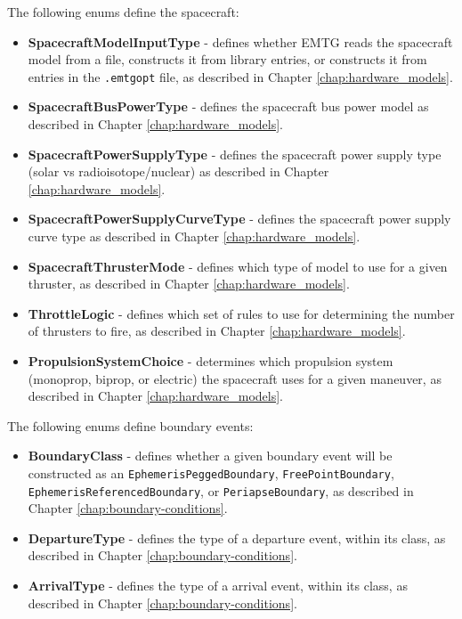 The following enums define the spacecraft:
\begin{itemize}
	\item \textbf{SpacecraftModelInputType} - defines whether EMTG reads the spacecraft model from a file, constructs it from library entries, or constructs it from entries in the \texttt{.emtgopt} file, as described in Chapter \ref{chap:hardware_models}.
	\item \textbf{SpacecraftBusPowerType} - defines the spacecraft bus power model as described in Chapter \ref{chap:hardware_models}.
	\item \textbf{SpacecraftPowerSupplyType} - defines the spacecraft power supply type (solar vs radioisotope/nuclear) as described in Chapter \ref{chap:hardware_models}.
	\item \textbf{SpacecraftPowerSupplyCurveType} - defines the spacecraft power supply curve type as described in Chapter \ref{chap:hardware_models}.
	\item \textbf{SpacecraftThrusterMode} - defines which type of model to use for a given thruster, as described in Chapter \ref{chap:hardware_models}.
	\item \textbf{ThrottleLogic} - defines which set of rules to use for determining the number of thrusters to fire, as described in Chapter \ref{chap:hardware_models}.
	\item \textbf{PropulsionSystemChoice} - determines which propulsion system (monoprop, biprop, or electric) the spacecraft uses for a given maneuver, as described in Chapter \ref{chap:hardware_models}.
\end{itemize}

The following enums define boundary events:
\begin{itemize}
	\item \textbf{BoundaryClass} - defines whether a given boundary event will be constructed as an \texttt{EphemerisPeggedBoundary}, \texttt{FreePointBoundary}, \texttt{EphemerisReferencedBoundary}, or \texttt{PeriapseBoundary}, as described in Chapter \ref{chap:boundary-conditions}.
	\item \textbf{DepartureType} - defines the type of a departure event, within its class, as described in Chapter \ref{chap:boundary-conditions}.
	\item \textbf{ArrivalType} - defines the type of a arrival event, within its class, as described in Chapter \ref{chap:boundary-conditions}.
\end{itemize}

